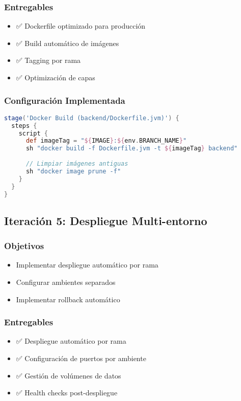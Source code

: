 \documentclass[12pt,a4paper]{article}
\begin{document}
\subsubsection{Entregables}
\begin{itemize}
    \item ✅ Dockerfile optimizado para producción
    \item ✅ Build automático de imágenes
    \item ✅ Tagging por rama
    \item ✅ Optimización de capas
\end{itemize}

\subsubsection{Configuración Implementada}
\begin{lstlisting}[language=groovy]
stage('Docker Build (backend/Dockerfile.jvm)') {
  steps {
    script {
      def imageTag = "${IMAGE}:${env.BRANCH_NAME}"
      sh "docker build -f Dockerfile.jvm -t ${imageTag} backend"
      
      // Limpiar imágenes antiguas
      sh "docker image prune -f"
    }
  }
}
\end{lstlisting}

\subsection{Iteración 5: Despliegue Multi-entorno}

\subsubsection{Objetivos}
\begin{itemize}
    \item Implementar despliegue automático por rama
    \item Configurar ambientes separados
    \item Implementar rollback automático
\end{itemize}

\subsubsection{Entregables}
\begin{itemize}
    \item ✅ Despliegue automático por rama
    \item ✅ Configuración de puertos por ambiente
    \item ✅ Gestión de volúmenes de datos
    \item ✅ Health checks post-despliegue
\end{itemize}
\end{document}
